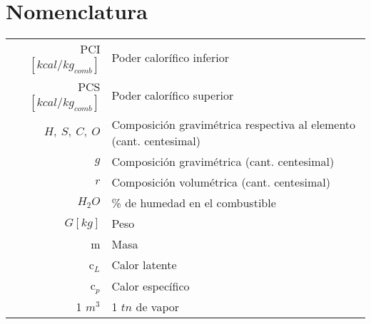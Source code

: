 \documentclass[11pt,a4paper]{article}
\begin{document}
	\pagestyle{pieyencabezado}
	
	\section*{Nomenclatura}
	\begin{tabular}{r l}
		PCI $[kcal / kg_{comb}]$ & Poder calorífico inferior \\
		PCS $[kcal / kg_{comb}]$ & Poder calorífico superior \\
		$H,\ S,\ C,\ O$ & Composición gravimétrica respectiva al elemento (cant. centesimal)\\
		$g$ & Composición gravimétrica (cant. centesimal)\\
		$r$ & Composición volumétrica (cant. centesimal)\\
		$H_2O$ & \% de humedad en el combustible \\
		$G [kg]$ & Peso\\
		m & Masa\\
		c$_{L}$ & Calor latente\\
		c$_p$ & Calor específico\\
		1 $m^3$ & 1 $tn$ de vapor
	\end{tabular}

	
\end{document}
